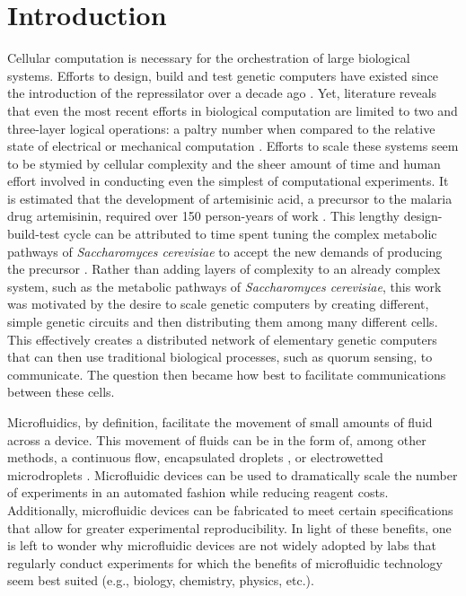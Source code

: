 \chapter{Introduction}
\label{chapter:Introduction}
\thispagestyle{myheadings}


Cellular computation is necessary for the orchestration of large biological systems. Efforts to design, build and test genetic computers have existed since the introduction of the repressilator over a decade ago \cite{elowitz2000}. Yet, literature reveals that even the most recent efforts in biological computation are limited to two and three-layer logical operations: a paltry number when compared to the relative state of electrical or mechanical computation \cite{nielsen2016genetic}. Efforts to scale these systems seem to be stymied by cellular complexity and the sheer amount of time and human effort involved in conducting even the simplest of computational experiments. It is estimated that the development of artemisinic acid, a precursor to the malaria drug artemisinin, required over 150 person-years of work \cite{kwok2010five}. This lengthy design-build-test cycle can be attributed to time spent tuning the complex metabolic pathways of \textit{Saccharomyces cerevisiae} to accept the new demands of producing the precursor \cite{artemisin}. Rather than adding layers of complexity to an already complex system, such as the metabolic pathways of \textit{Saccharomyces cerevisiae}, this work was motivated by the desire to scale genetic computers by creating different, simple genetic circuits and then distributing them among many different cells. This effectively creates a distributed network of elementary genetic computers that can then use traditional biological processes, such as quorum sensing, to communicate. The question then became how best to facilitate communications between these cells. 

Microfluidics, by definition, facilitate the movement of small amounts of fluid across a device. This movement of fluids can be in the form of, among other methods, a continuous flow, encapsulated droplets \cite{teh2008droplet}, or electrowetted microdroplets \cite{kim2001micropumping}. Microfluidic devices can be used to dramatically scale the number of experiments in an automated fashion while reducing reagent costs. Additionally, microfluidic devices can be fabricated to meet certain specifications that allow for greater experimental reproducibility. In light of these benefits, one is left to wonder why microfluidic devices are not widely adopted by labs that regularly conduct experiments for which the benefits of microfluidic technology seem best suited (e.g., biology, chemistry, physics, etc.). 

